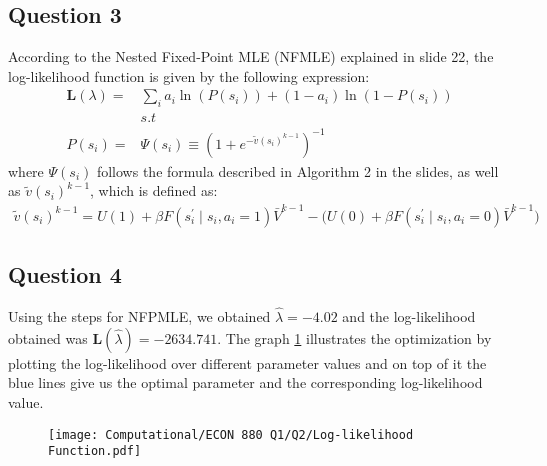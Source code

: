 \documentclass[12pt,english]{article}
\begin{document}
\subsection*{Question 3}
According to the Nested Fixed-Point MLE (NFMLE) explained in slide 22, the log-likelihood function is given by the following expression:
$$
   \begin{aligned}
    \textbf{L}(\lambda) = &  \sum_{i} a_i \ln(P(s_i)) + (1 - a_i) \ln(1 - P(s_i))\\
   & s.t \\
   P(s_i) = &\Psi(s_i) \equiv (1 + e^{-\tilde{{v}}(s_i)^{k-1}})^{-1}
    \end{aligned}
$$
where $\Psi(s_i)$ follows the formula described in Algorithm 2 in the slides, as well as $\tilde{{v}}(s_i)^{k-1}$, which is defined as:
$$
   \begin{aligned}   
   \tilde{{v}}(s_i)^{k-1} = U(1) + \beta F\left(s_i^{\prime} \mid s_i, a_i=1\right)\bar{V}^{k-1} - \Big(U(0) + \beta F\left(s_i^{\prime} \mid s_i, a_i=0\right)\bar{V}^{k-1}\Big)
   \end{aligned}
$$


\subsection*{Question 4}
Using the steps for NFPMLE, we obtained $\hat{\lambda} =-4.02$ and the log-likelihood obtained was $\textbf{L}(\hat{\lambda}) =-2634.741$. The graph \ref{fig1} illustrates the optimization by plotting the log-likelihood over different parameter values and on top of it the blue lines give us the optimal parameter and the corresponding log-likelihood value.

\begin{figure}[ht!]
    \centering
    \texttt{[image: Computational/ECON 880 Q1/Q2/Log-likelihood Function.pdf]}
    \vspace{-1cm}
    \caption{}
    \label{fig1}
\end{figure}

   
\end{document}
